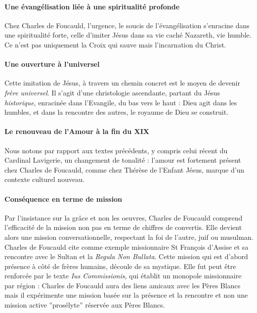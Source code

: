 \paragraph{Une évangélisation liée à une spiritualité profonde} Chez Charles de Foucauld, l'urgence, le soucis de l'évangélisation s'enracine dans une spiritualité forte, celle d'imiter Jésus dans sa vie caché Nazareth, vie humble.  Ce n'est pas uniquement la Croix qui sauve mais l'incarnation du Christ.

\paragraph{Une ouverture à l'universel} Cette imitation de Jésus, à travers un chemin concret est le moyen de devenir \textit{frère universel}. Il s'agit d'une christologie ascendante, partant du Jésus \textit{historique}, enracinée dans l'Evangile, du bas vers le haut : Dieu agit dans les humbles, et dans la rencontre des autres,  le royaume de Dieu se construit.  

\paragraph{Le renouveau de l'Amour à la fin du XIX} Nous notons par rapport aux textes précédents, y compris celui récent du Cardinal Lavigerie, un changement de tonalité : l'amour est fortement présent chez Charles de Foucauld, comme chez Thérèse de l'Enfant Jésus, marque d'un contexte culturel nouveau.

\paragraph{Conséquence en terme de mission} Par l'insistance sur la grâce et non les oeuvres, Charles de Foucauld comprend l'efficacité de la mission non pas en terme de chiffres de convertis. Elle devient alors une mission conversationnelle, respectant la foi de l'autre, juif ou musulman. Charles de Foucauld cite comme exemple missionnaire St François d'Assise et sa rencontre avec le Sultan et la \textit{Regula Non Bullata}. Cette mission qui est d'abord présence à côté de frères humains,  découle de sa mystique. Elle fut peut être renforcée par le texte \textit{Ius Commissionis}, qui établit un monopole missionnaire par région : Charles de Foucauld aura des liens amicaux avec les Pères Blancs mais il expérimente une mission basée sur la présence et la rencontre et non une mission active ”prosélyte” réservée aux Pères Blancs.

